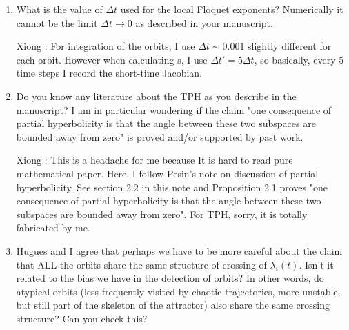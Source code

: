 \begin{description}
\begin{enumerate}
{\bf Ruslan:} Even though the search is seeded with a close return within the chaotic orbit, the search algorithm is not restricted to stay on the attractor (or even on the inertial manifold).   So, if such orbits outside the chaotic attractor existed, then I believe they would have been detected (at least some of them).  My belief that there is nothing else 'out there' is also based on the observation that the dynamics of the KS is strongly dissipative and the region around $u=0$ (the trivial solution) is completely surrounded by the attractor.  So, I just cannot think of any other 'far away regions' where something could be happening outside of the chaotic attractor. (There is probably also an argument that can be made in terms of a suitable Lyapunov function for this system, but I'm not clever enough to think it through.)

\item
What is the value of $\Delta t$ used for the local Floquet exponents? Numerically it cannot be the limit $\Delta t \to 0$ as described in your manuscript.

Xiong : For integration of the orbits, I use $\Delta t \sim 0.001$
slightly different for each orbit. However when calculating \Fe s,
I use $\Delta t' = 5\Delta t$, so basically, every 5 time steps I
record the short-time Jacobian.

\item
Do you know any literature about the TPH as you describe in the manuscript? I am in particular wondering if the claim "one consequence of partial hyperbolicity is that the angle between these two subspaces are bounded away from zero" is proved and/or supported by past work.

Xiong : This is a headache for me because It is hard to read pure
mathematical paper. Here, I follow Pesin's note on
discussion of partial hyperbolicity. See section 2.2 in this note
and Proposition 2.1 proves
"one consequence of partial hyperbolicity is that the angle between these
two subspaces are bounded away from zero". For TPH, sorry, it is
totally fabricated by me.


\item
Hugues and I agree that perhaps we have to be more careful about the claim that ALL the orbits share the same structure of crossing of $\lambda_i(t)$. Isn't it related to the bias we have in the detection of orbits? In other words, do atypical orbits (less frequently visited by chaotic trajectories, more unstable, but still part of the skeleton of the attractor) also share the same crossing structure? Can you check this?


\end{enumerate}
\end{description}
